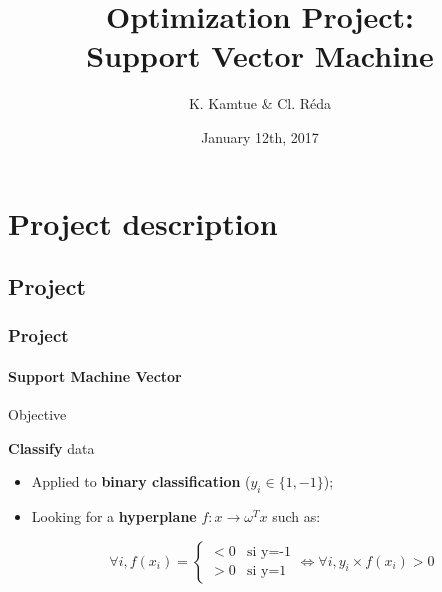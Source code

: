 \documentclass{beamer}
\title{Optimization Project:\\Support Vector Machine}
\author{K. Kamtue \& Cl. Réda}
\institute{\textsc{ENS Cachan}}
\date{January 12th, 2017}
\begin{document}
\maketitle
\tableofcontents
\setlength{\parindent}{1cm}

\section{Project description}

\subsection{Project}

\begin{frame}
\tableofcontents[currentsubsection]
\end{frame}

\begin{frame}
\frametitle{Project}
\framesubtitle{\textbf{Support Machine Vector}}

\begin{alertblock}{Objective}
\begin{center}
\textbf{Classify} data
\end{center}
\end{alertblock}

\pause

\begin{itemize}
\item Applied to \textbf{binary classification} ($y_i \in \{1, -1\}$);

\pause

\item Looking for a \textbf{hyperplane} $f : x \rightarrow \omega^Tx$ such as:
         
          \begin{center}
           \begin{equation}
         \forall i, f(x_i) = 
         \begin{cases}
         <0 &\mbox {si y=-1} \\
         >0 &\mbox {si y=1}
         \end{cases}
         \Leftrightarrow \forall i, y_i \times f(x_i) > 0 
         \end{equation}
         \end{center}
\end{itemize}

\end{frame}
\end{document}
